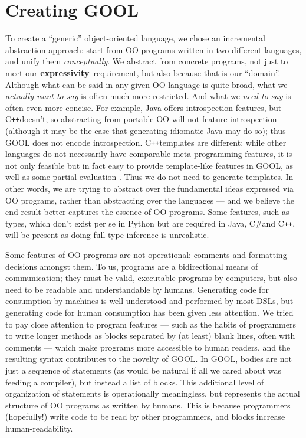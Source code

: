 \documentclass[sigplan,review,prologue,dvipsnames]{acmart}
\newcommand{\Csharp}{C\#}
\newcommand{\Cplusplus}{C\texttt{++}}
\newcommand{\abbrev}[1]{\textbf{#1}}
\newcommand{\expressivity}{\abbrev{expressivity}}
\begin{document}
\section{Creating GOOL} \label{sec:creating}

To create a ``generic'' object-oriented language,
we chose an incremental abstraction approach: start from OO programs written in 
two different languages, and unify them \emph{conceptually}.
We abstract from concrete programs, not just to meet our
\expressivity~requirement, but also because that is our ``domain''.  Although
what can be said in any given OO language is quite broad, what we
\emph{actually want to say} is often much more restricted. And what we
\emph{need to say} is often even more concise.
For example, Java offers introspection features, but \Cplusplus doesn't, so
abstracting from portable OO will not feature introspection (although it
may be the case that generating idiomatic Java may do so);
thus GOOL does not encode introspection.  \Cplusplus templates
are different: while other languages do not necessarily have comparable
meta-programming features, it is not only feasible but in fact easy to provide
template-like features in GOOL, as well as some
partial evaluation . Thus we do not need to generate templates.
In other words, we are trying to abstract over the fundamental ideas
expressed via OO programs, rather than abstracting over the languages ---
and we believe the end result better captures the essence of OO programs.
Some features, such as types, which don't exist per se in 
Python but are required in Java, \Csharp and \Cplusplus, will be present
as doing full type inference is unrealistic.

Some features of OO programs are not operational: comments and formatting
decisions amongst them.  To us, programs are a bidirectional means of
communication; they must be valid, executable programs by computers, but
also need to be readable and understandable by humans.
Generating code for consumption by machines is well understood and performed by 
most DSLs, but generating code for human consumption has been given less 
attention. We tried to pay close attention to program features --- such
as the habits of programmers to write longer methods as blocks separated
by (at least) blank lines, often with comments --- which make programs
more accessible to human readers, and the resulting syntax contributes to the 
novelty of GOOL. In GOOL, bodies are not just a sequence of statements (as 
would be natural if all we cared about was feeding a compiler), but instead a 
list of blocks. This additional level of organization of statements is 
operationally meaningless, but represents the actual structure of OO programs 
as written by humans.  This is because programmers (hopefully!) write code to 
be read by other programmers, and blocks increase human-readability.
\end{document}
